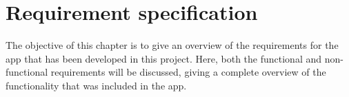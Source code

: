 \chapter{Requirement specification}
\label{sec:recSpecification}

The objective of this chapter is to give an overview of the requirements for the app that has been developed in this project. Here, both the functional and non-functional requirements will be discussed, giving a complete overview of the functionality that was included in the app.



\newpage

